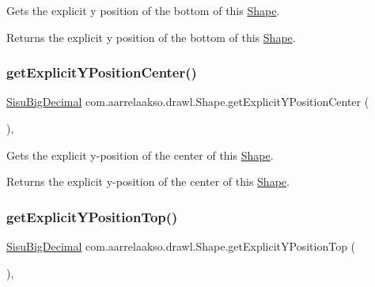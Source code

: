 Gets the explicit y position of the bottom of this \hyperlink{classcom_1_1aarrelaakso_1_1drawl_1_1_shape}{Shape}. 

\begin{DoxyReturn}{Returns}
the explicit y position of the bottom of this \hyperlink{classcom_1_1aarrelaakso_1_1drawl_1_1_shape}{Shape}. 
\end{DoxyReturn}
\mbox{\label{classcom_1_1aarrelaakso_1_1drawl_1_1_shape_a6499eaa6fd9cdef3d77fe20a5b039401}} 
\subsubsection{\texorpdfstring{get\+Explicit\+Y\+Position\+Center()}{getExplicitYPositionCenter()}}
{\footnotesize\ttfamily \hyperlink{classcom_1_1aarrelaakso_1_1drawl_1_1_sisu_big_decimal}{Sisu\+Big\+Decimal} com.\+aarrelaakso.\+drawl.\+Shape.\+get\+Explicit\+Y\+Position\+Center (\begin{DoxyParamCaption}{ }\end{DoxyParamCaption})\hspace{0.3cm}{\ttfamily [protected]}, {\ttfamily [inherited]}}



Gets the explicit y-\/position of the center of this \hyperlink{classcom_1_1aarrelaakso_1_1drawl_1_1_shape}{Shape}. 

\begin{DoxyReturn}{Returns}
the explicit y-\/position of the center of this \hyperlink{classcom_1_1aarrelaakso_1_1drawl_1_1_shape}{Shape}. 
\end{DoxyReturn}
\mbox{\label{classcom_1_1aarrelaakso_1_1drawl_1_1_shape_af5d7293539d67234c9941e6abc3e642b}} 
\subsubsection{\texorpdfstring{get\+Explicit\+Y\+Position\+Top()}{getExplicitYPositionTop()}}
{\footnotesize\ttfamily \hyperlink{classcom_1_1aarrelaakso_1_1drawl_1_1_sisu_big_decimal}{Sisu\+Big\+Decimal} com.\+aarrelaakso.\+drawl.\+Shape.\+get\+Explicit\+Y\+Position\+Top (\begin{DoxyParamCaption}{ }\end{DoxyParamCaption})\hspace{0.3cm}{\ttfamily [protected]}, {\ttfamily [inherited]}}



